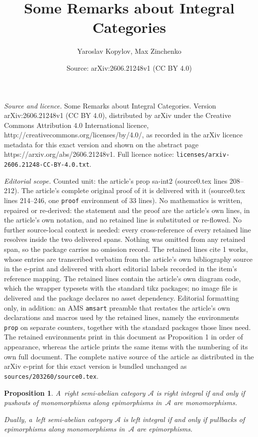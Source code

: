 \documentclass[10pt,a4paper]{amsart}
\title{Some Remarks about Integral Categories}
\author{Yaroslav Kopylov, Max Zinchenko}
\date{Source: arXiv:2606.21248v1 (CC BY 4.0)}
\newtheorem{prop}{Proposition}
\begin{document}
\maketitle

\noindent\emph{Source and licence.} Some Remarks about Integral Categories. Version arXiv:2606.21248v1 (CC BY 4.0), distributed by arXiv under the Creative Commons Attribution 4.0 International licence, http://creativecommons.org/licenses/by/4.0/, as recorded in the arXiv licence metadata for this exact version and shown on the abstract page https://arxiv.org/abs/2606.21248v1. Full licence notice: \texttt{licenses/arxiv-2606.21248-CC-BY-4.0.txt}.\par\smallskip

\noindent\textit{Editorial scope.} Counted unit: the article's prop sa-int2 (source0.tex lines 208--212). The article's complete original proof of it is delivered with it (source0.tex lines 214--246, one \texttt{proof} environment of 33 lines). No mathematics is written, repaired or re-derived: the statement and the proof are the article's own lines, in the article's own notation, and no retained line is substituted or re-flowed.  No further source-local context is needed: every cross-reference of every retained line resolves inside the two delivered spans.  Nothing was omitted from any retained span, so the package carries no omission record.  The retained lines cite 1 works, whose entries are transcribed verbatim from the article's own bibliography source in the e-print and delivered with short editorial labels recorded in the item's reference mapping.  The retained lines contain the article's own diagram code, which the wrapper typesets with the standard tikz packages; no image file is delivered and the package declares no asset dependency.  Editorial formatting only, in addition: an AMS \texttt{amsart} preamble that restates the article's own declarations and macros used by the retained lines, namely the environments \texttt{prop} on separate counters, together with the standard packages those lines need.  The retained environments print in this document as Proposition 1 in order of appearance, whereas the article prints the same items with the numbering of its own full document.  The complete native source of the article as distributed in the arXiv e-print for this exact version is bundled unchanged as \texttt{sources/203260/source0.tex}.
	\begin{prop}\label{sa-int2}
		A~right semi-abelian category $\mathcal{A}$ is right integral if and only if pushouts of monomorphisms along epimorphisms in~$\mathcal{A}$ are monomorphisms.
		
		Dually, a~left semi-abelian category $\mathcal{A}$ is left integral if and only if pullbacks of epimorphisms along monomorphisms in~$\mathcal{A}$ are epimorphisms.
	\end{prop}
\end{document}
